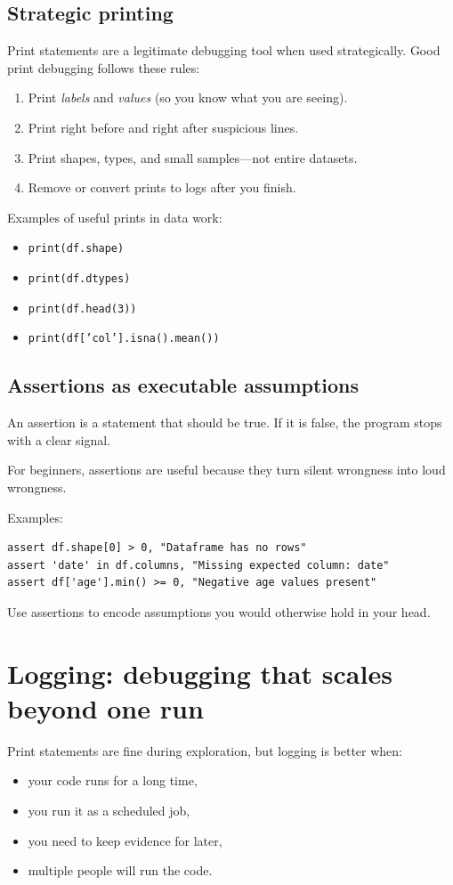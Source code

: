 \subsection{Strategic printing}
Print statements are a legitimate debugging tool when used strategically. Good print debugging follows these rules:
\begin{enumerate}[noitemsep]
  \item Print \emph{labels} and \emph{values} (so you know what you are seeing).
  \item Print right before and right after suspicious lines.
  \item Print shapes, types, and small samples—not entire datasets.
  \item Remove or convert prints to logs after you finish.
\end{enumerate}

Examples of useful prints in data work:
\begin{itemize}[noitemsep]
  \item \texttt{print(df.shape)}
  \item \texttt{print(df.dtypes)}
  \item \texttt{print(df.head(3))}
  \item \texttt{print(df['col'].isna().mean())}
\end{itemize}

\subsection{Assertions as executable assumptions}
An assertion is a statement that should be true. If it is false, the program stops with a clear signal.

For beginners, assertions are useful because they turn silent wrongness into loud wrongness.

Examples:
\begin{verbatim}
assert df.shape[0] > 0, "Dataframe has no rows"
assert 'date' in df.columns, "Missing expected column: date"
assert df['age'].min() >= 0, "Negative age values present"
\end{verbatim}

Use assertions to encode assumptions you would otherwise hold in your head.

\section{Logging: debugging that scales beyond one run}
Print statements are fine during exploration, but logging is better when:
\begin{itemize}[noitemsep]
  \item your code runs for a long time,
  \item you run it as a scheduled job,
  \item you need to keep evidence for later,
  \item multiple people will run the code.
\end{itemize}

